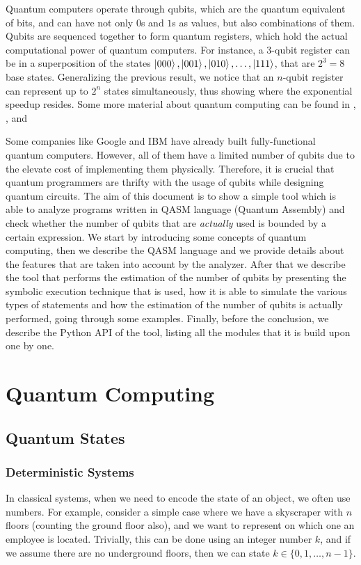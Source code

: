 \documentclass[12pt,a4paper]{report}
\theoremstyle{definition}
\theoremstyle{definition}
\theoremstyle{definition}
\begin{document}
Quantum computers operate through qubits, which are the quantum equivalent of bits, and can have not only $0$s and $1$s as values, but also combinations of them. Qubits are sequenced together to form quantum registers, which hold the actual computational power of quantum computers. For instance, a 3-qubit register can be in a superposition of the states $\ket{000}, \ket{001}, \ket{010}, \ldots, \ket{111}$, that are $2^3=8$ base states. Generalizing the previous result, we notice that an $n$-qubit register can represent up to $2^n$ states simultaneously, thus showing where the exponential speedup resides. Some more material about quantum computing can be found in \cite{qccs}, \cite{gribbin2014computing}, \cite{nielsen2010quantum} and \cite{perry2012quantum}

Some companies like Google and IBM have already built fully-functional quantum computers. However, all of them have a limited number of qubits due to the elevate cost of implementing them physically. Therefore, it is crucial that quantum programmers are thrifty with the usage of qubits while designing quantum circuits. The aim of this document is to show a simple tool which is able to analyze programs written in QASM language (Quantum Assembly) and check whether the number of qubits that are \textit{actually} used is bounded by a certain expression.
We start by introducing some concepts of quantum computing, then we describe the QASM language and we provide details about the features that are taken into account by the analyzer. After that we describe the tool that performs the estimation of the number of qubits by presenting the symbolic execution technique that is used, how it is able to simulate the various types of statements and how the estimation of the number of qubits is actually performed, going through some examples. Finally, before the conclusion, we describe the Python API of the tool, listing all the modules that it is build upon one by one.



\chapter{Quantum Computing}


\section{Quantum States}
\subsection{Deterministic Systems}
In classical systems, when we need to encode the state of an object, we often use numbers. For example, consider a simple case where we have a skyscraper with $n$ floors (counting the ground floor also), and we want to represent on which one an employee is located. Trivially, this can be done using an integer number $k$, and if we assume there are no underground floors, then we can state $k \in \{0, 1, \ldots, n-1\}$.
\end{document}
